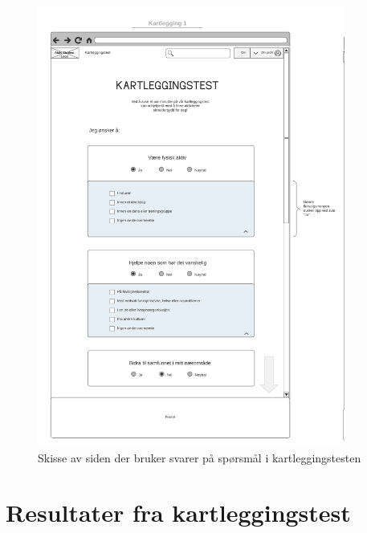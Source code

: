 \begin{figure}[H]
\centering
\includegraphics[width=0.9\textwidth]{Illustrasjoner/Skisser/2.0/2-12-kartleggingstest-spm.png}
\caption{Skisse av siden der bruker svarer på spørsmål i kartleggingstesten}
\label{vedlegg:2-12-kartlegging-spm}
\end{figure}

\section{Resultater fra kartleggingstest}

